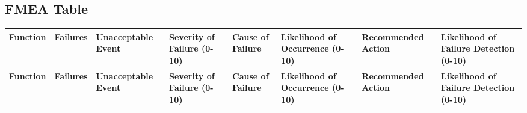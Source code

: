 \documentclass{article}
\begin{document}
\clearpage
\begin{landscape}
\subsection{FMEA Table}

\begin{longtable}{|>{\raggedright}m{2.5cm}|>{\raggedright}m{2.5cm}|>{\raggedright}m{3cm}|>{\centering}m{1.5cm}|>{\raggedright}m{3cm}|>{\centering}m{1.5cm}|>{\raggedright}m{3cm}|>{\centering}m{2cm}|}
\hline
\textbf{Function} & \textbf{Failures} & \textbf{Unacceptable Event} & \textbf{Severity of Failure (0-10)} & \textbf{Cause of Failure} & \textbf{Likelihood of Occurrence (0-10)} & \textbf{Recommended Action} & \textbf{Likelihood of Failure Detection (0-10)} \\ \hline
\endfirsthead

\hline
\textbf{Function} & \textbf{Failures} & \textbf{Unacceptable Event} & \textbf{Severity of Failure (0-10)} & \textbf{Cause of Failure} & \textbf{Likelihood of Occurrence (0-10)} & \textbf{Recommended Action} & \textbf{Likelihood of Failure Detection (0-10)} \\ \hline
\endhead


\end{longtable}
\end{landscape}
\end{document}

